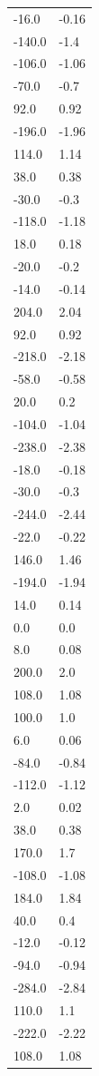 \begin{longtable}{ll}
-16.0 & -0.16 \\
-140.0 & -1.4 \\
-106.0 & -1.06 \\
-70.0 & -0.7 \\
92.0 & 0.92 \\
-196.0 & -1.96 \\
114.0 & 1.14 \\
38.0 & 0.38 \\
-30.0 & -0.3 \\
-118.0 & -1.18 \\
18.0 & 0.18 \\
-20.0 & -0.2 \\
-14.0 & -0.14 \\
204.0 & 2.04 \\
92.0 & 0.92 \\
-218.0 & -2.18 \\
-58.0 & -0.58 \\
20.0 & 0.2 \\
-104.0 & -1.04 \\
-238.0 & -2.38 \\
-18.0 & -0.18 \\
-30.0 & -0.3 \\
-244.0 & -2.44 \\
-22.0 & -0.22 \\
146.0 & 1.46 \\
-194.0 & -1.94 \\
14.0 & 0.14 \\
0.0 & 0.0 \\
8.0 & 0.08 \\
200.0 & 2.0 \\
108.0 & 1.08 \\
100.0 & 1.0 \\
6.0 & 0.06 \\
-84.0 & -0.84 \\
-112.0 & -1.12 \\
2.0 & 0.02 \\
38.0 & 0.38 \\
170.0 & 1.7 \\
-108.0 & -1.08 \\
184.0 & 1.84 \\
40.0 & 0.4 \\
-12.0 & -0.12 \\
-94.0 & -0.94 \\
-284.0 & -2.84 \\
110.0 & 1.1 \\
-222.0 & -2.22 \\
108.0 & 1.08 \\

\end{longtable}
